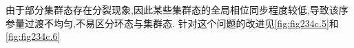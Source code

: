 \documentclass{article}
\begin{document}
\vspace{-0.5cm}
由于部分集群态存在分裂现象,因此某些集群态的全局相位同步程度较低,导致该序参量过渡不均匀,不易区分环态与集群态. 针对这个问题的改进见\ref{fig:fig234c.5}和\ref{fig:fig234c.6}










\end{document}
